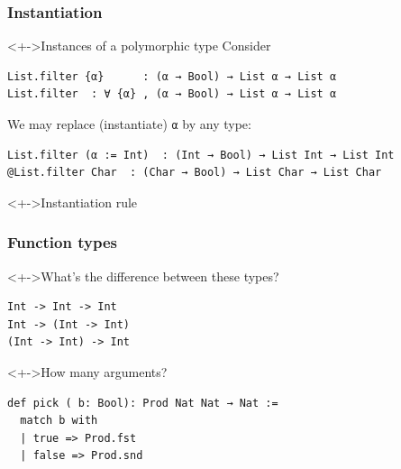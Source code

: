 \documentclass{beamer}
\begin{document}
\begin{frame}[fragile]
  \frametitle{Instantiation}
  \begin{block}<+->{Instances of a polymorphic type}
    Consider
\begin{lstlisting}
List.filter {α}      : (α → Bool) → List α → List α
List.filter  : ∀ {α} , (α → Bool) → List α → List α
\end{lstlisting}
    We may replace (instantiate) \lstinline{α} by any type:
\begin{lstlisting}
List.filter (α := Int)  : (Int → Bool) → List Int → List Int
@List.filter Char  : (Char → Bool) → List Char → List Char
\end{lstlisting}
  \end{block}
  \begin{block}<+->{Instantiation rule}
    \vspace{-0.5\baselineskip}
    \begin{mathpar}
    \end{mathpar}
  \end{block}
\end{frame}
\begin{frame}[fragile]
  \frametitle{Function types}
  \begin{block}<+->{What's the difference between these types?}
\begin{verbatim}
Int -> Int -> Int
Int -> (Int -> Int)
(Int -> Int) -> Int
\end{verbatim}
  \end{block}
  \begin{block}<+->{How many arguments?}
\begin{lstlisting}
def pick ( b: Bool): Prod Nat Nat → Nat :=
  match b with
  | true => Prod.fst
  | false => Prod.snd
\end{lstlisting}
  \end{block}  
\end{frame}
\end{document}
